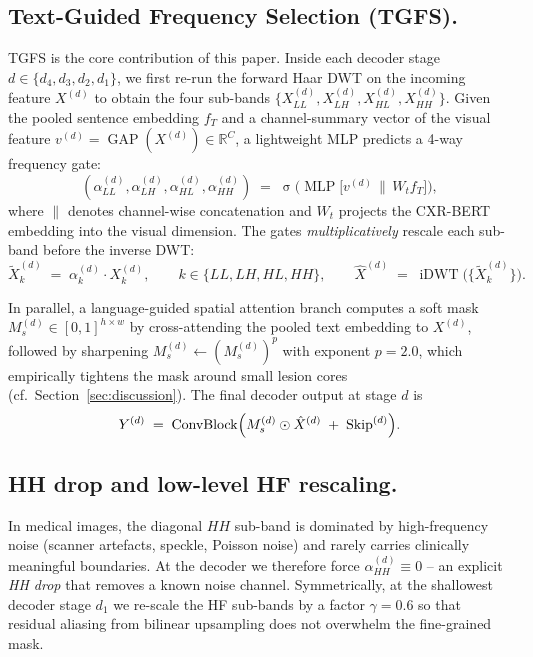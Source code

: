 \documentclass[runningheads]{llncs}
\newcommand{\tgfs}{TGFS\xspace}
\DeclareMathOperator{\sigmoid}{\sigma}
\DeclareMathOperator{\iDWT}{iDWT}
\DeclareMathOperator{\GAP}{GAP}
\DeclareMathOperator{\MLP}{MLP}
\begin{document}
\subsection{Text-Guided Frequency Selection (\tgfs).}
\label{sec:tgfs}
\tgfs is the core contribution of this paper. Inside each decoder
stage $d\!\in\!\{d_4,d_3,d_2,d_1\}$, we first re-run the forward Haar
DWT on the incoming feature $X^{(d)}$ to obtain the four sub-bands
$\{X^{(d)}_{LL},X^{(d)}_{LH},X^{(d)}_{HL},X^{(d)}_{HH}\}$. Given the
pooled sentence embedding $f_T$ and a channel-summary vector of the
visual feature $v^{(d)}\!=\!\GAP(X^{(d)})\!\in\!\mathbb{R}^{C}$, a
lightweight MLP predicts a 4-way frequency gate:
\begin{equation}
(\alpha^{(d)}_{LL},\alpha^{(d)}_{LH},\alpha^{(d)}_{HL},\alpha^{(d)}_{HH})
\;=\;\sigmoid\!\bigl(\MLP\bigl[v^{(d)}\,\|\,W_t f_T\bigr]\bigr),
\label{eq:tgfs}
\end{equation}
where $\|$ denotes channel-wise concatenation and $W_t$ projects the
CXR-BERT embedding into the visual dimension. The gates
\emph{multiplicatively} rescale each sub-band before the inverse
DWT:
\begin{equation}
\tilde X^{(d)}_k \;=\; \alpha^{(d)}_k \cdot X^{(d)}_k,\qquad
k\in\{LL,LH,HL,HH\},\qquad
\hat X^{(d)} \;=\; \iDWT\bigl(\{\tilde X^{(d)}_k\}\bigr).
\label{eq:gating}
\end{equation}

In parallel, a language-guided spatial attention branch computes a
soft mask $M_s^{(d)}\!\in\![0,1]^{h\times w}$ by cross-attending the
pooled text embedding to $X^{(d)}$, followed by sharpening
$M_s^{(d)}\!\leftarrow\!(M_s^{(d)})^{p}$ with exponent $p\!=\!2.0$,
which empirically tightens the mask around small lesion cores (cf.\
Section~\ref{sec:discussion}). The final decoder output at stage $d$ is
\begin{equation}
Y^{(d)} \;=\; \mathrm{ConvBlock}\Bigl( M_s^{(d)} \odot
\hat X^{(d)} \;+\; \mathrm{Skip}^{(d)} \Bigr).
\label{eq:decoder}
\end{equation}

\subsection{HH drop and low-level HF rescaling.}
\label{sec:hhdrop}
In medical images, the diagonal $HH$ sub-band is dominated by
high-frequency noise (scanner artefacts, speckle, Poisson noise) and
rarely carries clinically meaningful boundaries. At the decoder we
therefore force $\alpha^{(d)}_{HH}\!\equiv\!0$ -- an explicit
\emph{HH drop} that removes a known noise channel. Symmetrically, at
the shallowest decoder stage $d_1$ we re-scale the HF sub-bands by a
factor $\gamma=0.6$ so that residual aliasing from bilinear upsampling
does not overwhelm the fine-grained mask.
\end{document}
